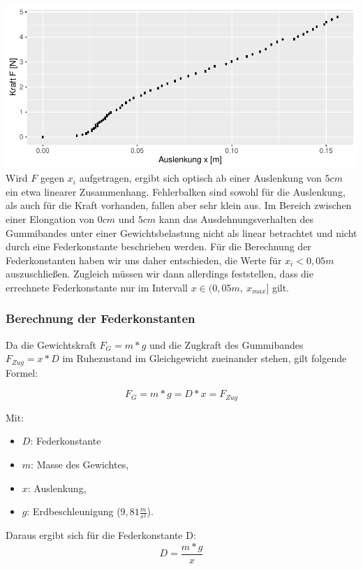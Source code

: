 \documentclass[class=article, crop=false]{standalone}
\providecommand{\tightlist}{%
  \setlength{\itemsep}{0pt}\setlength{\parskip}{0pt}}
\begin{document}
\includegraphics{DehnbareStoffe_files/figure-latex/unnamed-chunk-6-1.pdf}
Wird \(F\) gegen \(x_i\) aufgetragen, ergibt sich optisch ab einer
Auslenkung von \(5cm\) ein etwa linearer Zusammenhang. Fehlerbalken sind
sowohl für die Auslenkung, als auch für die Kraft vorhanden, fallen aber
sehr klein aus. Im Bereich zwischen einer Elongation von \(0cm\) und
\(5cm\) kann das Ausdehnungsverhalten des Gummibandes unter einer
Gewichtsbelastung nicht als linear betrachtet und nicht durch eine
Federkonstante beschrieben werden. Für die Berechnung der
Federkonstanten haben wir uns daher entschieden, die Werte für
\(x_i<0,05m\) auszuschließen. Zugleich müssen wir dann allerdings
feststellen, dass die errechnete Federkonstante nur im Intervall
\(x \in (0,05m,\ x_{max}]\) gilt.

\hypertarget{berechnung-der-federkonstanten}{%
\subsubsection{Berechnung der
Federkonstanten}\label{berechnung-der-federkonstanten}}

Da die Gewichtskraft \(F_G=m*g\) und die Zugkraft des Gummibandes
\(F_{Zug} = x * D\) im Ruhezustand im Gleichgewicht zueinander stehen,
gilt folgende Formel:

\[F_G = m * g = D*x = F_{Zug}\]

Mit:

\begin{itemize}
\tightlist
\item
  \(D\): Federkonstante
\item
  \(m\): Masse des Gewichtes,
\item
  \(x\): Auslenkung,
\item
  \(g\): Erdbeschleunigung (\(9,81\frac{m}{s^2}\)).
\end{itemize}

Daraus ergibt sich für die Federkonstante D:
\begin{equation}\label{hook:eq:Federkonstante}
  D =\frac{m*g}{x}
\end{equation}
\end{document}
